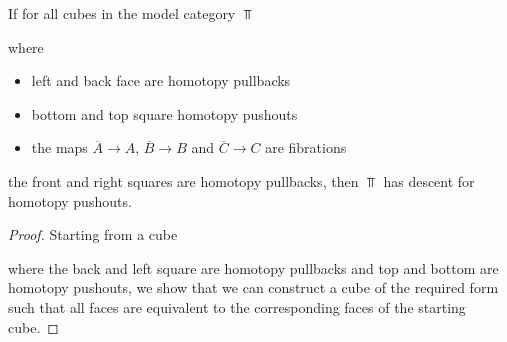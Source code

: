 \begin{lemma}\label{lem:reductionStepDescent}
    If for all cubes in the model category $\Top$
    \begin{center}
    \end{center}
    where 
    \begin{itemize}
        \item left and back face are homotopy pullbacks
        \item bottom and top square homotopy pushouts 
        \item the maps $\overline{A}\to A$, $\overline{B}\to B$ and $\overline{C}\to C$ are fibrations
    \end{itemize}
    the front and right squares are homotopy pullbacks, then $\Top$ has descent for homotopy pushouts.
    \begin{proof}
        Starting from a cube 
        \begin{center}
        \end{center}
        where the back and left square are homotopy pullbacks and top and bottom are homotopy pushouts, we show that we can construct a cube of the required form such that all faces are equivalent to the corresponding faces of the starting cube.
        

\end{proof}
\end{lemma}
